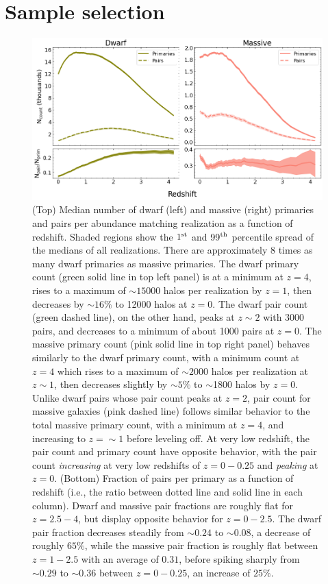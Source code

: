 \documentclass[twocolumn]{aastex631}
\begin{document}
\section{Sample selection}\label{sec:methods}
  \begin{figure}[htp]
    \centering
    \includegraphics[width=\textwidth]{counts_1000.png}
    \caption{(Top) Median number of dwarf (left) and massive (right) primaries and pairs per abundance matching realization as a function of redshift.
    Shaded regions show the $1^{\rm st}$ and 99$^{\rm th}$ percentile spread of the medians of all realizations. 
    There are approximately 8 times as many dwarf primaries as massive primaries. 
    The dwarf primary count (green solid line in top left panel) is at a minimum at $z=4$, rises to a maximum of $\sim15000$ halos per realization by $z=1$, then decreases by $\sim16\%$ to 12000 halos at $z=0$. The dwarf pair count (green dashed line), on the other hand, peaks at $z\sim2$ with 3000 pairs, and decreases to a minimum of about 1000 pairs at $z=0$.
    The massive primary count (pink solid line in top right panel) behaves similarly to the dwarf primary count, with a minimum count at $z=4$ which rises to a maximum of $\sim2000$ halos per realization at $z\sim1$, then decreases slightly by $\sim5\%$ to $\sim$1800 halos by $z=0$. 
    Unlike dwarf pairs whose pair count peaks at $z=2$, pair count for massive galaxies (pink dashed line) follows similar behavior to the total massive primary count, with a minimum at $z=4$, and increasing to $z=\sim 1$ before leveling off. At very low redshift, the pair count and primary count have opposite behavior, with the pair count \textit{increasing} at very low redshifts of $z=0-0.25$ and \textit{peaking} at $z=0$.
    (Bottom) Fraction of pairs per primary as a function of redshift (i.e., the ratio between dotted line and solid line in each column). Dwarf and massive pair fractions are roughly flat for $z=2.5-4$, but display opposite behavior for $z=0-2.5$. The dwarf pair fraction decreases steadily from $\sim0.24$ to $\sim0.08$, a decrease of roughly $65\%$, while the massive pair fraction is roughly flat between $z=1-2.5$ with an average of $0.31$, before spiking sharply from $\sim 0.29$ to $\sim 0.36$ between $z=0-0.25$, an increase of $25\%$.}
    \label{fig:counts}
  \end{figure}
\end{document}
